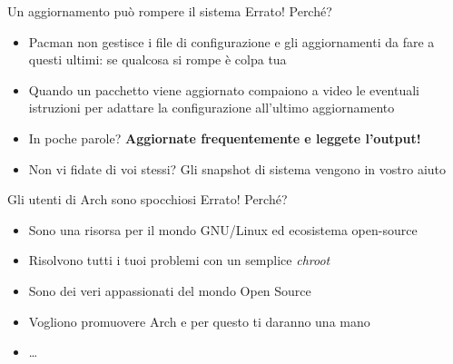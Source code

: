 
\begin{frame}{Un aggiornamento può rompere il sistema}
    \alert{Errato!} Perché?
    \begin{itemize}
        \item Pacman non gestisce i file di configurazione e gli aggiornamenti da fare a questi ultimi: se qualcosa si rompe è colpa tua
        \item Quando un pacchetto viene aggiornato compaiono a video le eventuali istruzioni per adattare la configurazione all'ultimo aggiornamento 
        \item In poche parole? \textbf{Aggiornate frequentemente e leggete l'output!}
        \item Non vi fidate di voi stessi? Gli snapshot di sistema vengono in vostro aiuto
    \end{itemize}
\end{frame}


\begin{frame}{Gli utenti di Arch sono spocchiosi}
    \alert{Errato!} Perché?
    \begin{itemize}
        \item Sono una risorsa per il mondo GNU/Linux ed ecosistema open-source
        \item Risolvono tutti i tuoi problemi con un semplice \textit{chroot}
        \item Sono dei veri appassionati del mondo Open Source
        \item Vogliono promuovere Arch e per questo ti daranno una mano
        \item \dots
    \end{itemize}
\end{frame}


